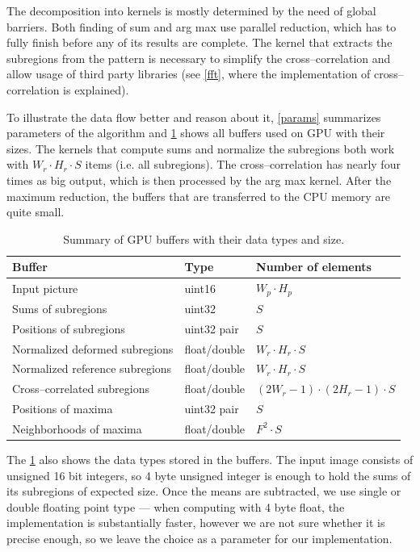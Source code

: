 The decomposition into kernels is mostly determined by the need of global barriers. Both finding of sum and arg max use parallel reduction, which has to fully finish before any of its results are complete. The kernel that extracts the subregions from the pattern is necessary to simplify the cross--correlation and allow usage of third party libraries (see \cref{fft}, where the implementation of cross--correlation is explained).

To illustrate the data flow better and reason about it, \cref{params} summarizes parameters of the algorithm and \cref{buftypes} shows all buffers used on GPU with their sizes. The kernels that compute sums and normalize the subregions both work with $W_r \cdot H_r \cdot S$ items (i.e. all subregions). The cross--correlation has nearly four times as big output, which is then processed by the arg max kernel. After the maximum reduction, the buffers that are transferred to the CPU memory are quite small.

\begin{table}[]
	\begin{tabular}{@{}lll@{}}
		\toprule
		Buffer                          & Type         & Number of elements             \\ \midrule
		Input picture                   & uint16       & $W_p \cdot H_p$                \\
		Sums of subregions              & uint32       & $S$                            \\
		Positions of subregions         & uint32 pair  & $S$                            \\
		Normalized deformed subregions  & float/double & $W_r \cdot H_r \cdot S$        \\
		Normalized reference subregions & float/double & $W_r \cdot H_r \cdot S$        \\
		Cross--correlated subregions    & float/double & $(2W_r-1)\cdot(2H_r-1)\cdot S$ \\
		Positions of maxima             & uint32 pair  & $S$                            \\
		Neighborhoods of maxima         & float/double & $F^2 \cdot S $                 \\ \bottomrule
	\end{tabular}
	\caption{Summary of GPU buffers with their data types and size.}
	\label{buftypes}
\end{table}

The \cref{buftypes} also shows the data types stored in the buffers. The input image consists of unsigned 16 bit integers, so 4 byte unsigned integer is enough to hold the sums of its subregions of expected size. Once the means are subtracted, we use single or double floating point type --- when computing with 4 byte float, the implementation is substantially faster, however we are not sure whether it is precise enough, so we leave the choice as a parameter for our implementation.

